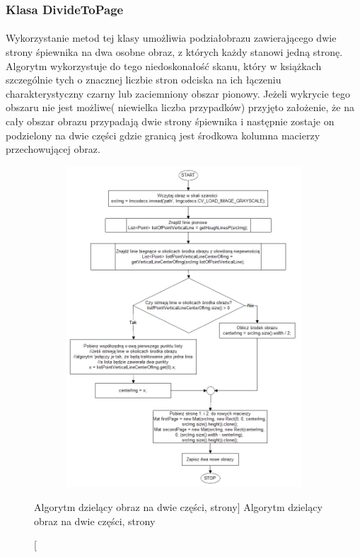 \documentclass[a4paper,12pt]{article}
\begin{document}
		\subsubsection{Klasa DivideToPage}
		    \paragraph{} Wykorzystanie metod tej klasy umożliwia podzia\l obrazu            zawierającego dwie strony śpiewnika na dwa osobne obraz, z których każdy     stanowi jedną stronę. Algorytm wykorzystuje do tego niedoskonałość          skanu, który w książkach szczególnie tych o znacznej liczbie stron          odciska na ich \l ączeniu charakterystyczny czarny lub zaciemniony          obszar pionowy. Jeżeli wykrycie tego obszaru nie jest możliwe( niewielka     liczba przypadków) przyjęto założenie, że na ca\l y obszar obrazu           przypadają dwie strony śpiewnika i następnie zostaje on podzielony na       dwie części gdzie granicą jest środkowa kolumna macierzy przechowującej     obraz.    
		    
    	        \begin{figure}[!ht]  
    			    \begin{center}
    				    \includegraphics[height=12cm, width=12cm]{image//algorithm//divideToPage.png} 
    			    \end{center}
    			    \caption
        			    [Algorytm dzielący obraz na dwie części, strony]
        			    {Algorytm dzielący obraz na dwie części, strony}  
    		    \end{figure}
    		
\end{document}
